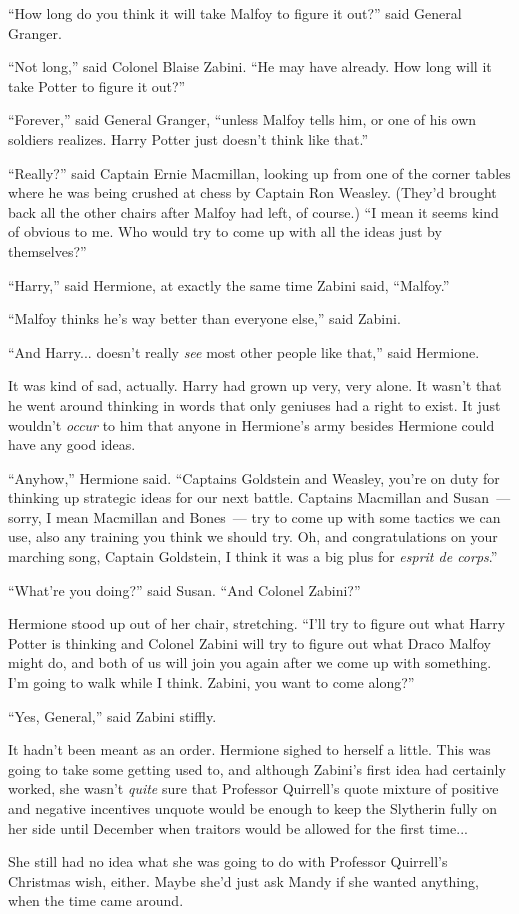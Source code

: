``How long do you think it will take Malfoy to figure it out?'' said General Granger.

``Not long,'' said Colonel Blaise Zabini. ``He may have already. How long will it take Potter to figure it out?''

``Forever,'' said General Granger, ``unless Malfoy tells him, or one of his own soldiers realizes. Harry Potter just doesn't think like that.''

``Really?'' said Captain Ernie Macmillan, looking up from one of the corner tables where he was being crushed at chess by Captain Ron Weasley. (They'd brought back all the other chairs after Malfoy had left, of course.) ``I mean it seems kind of obvious to me. Who would try to come up with all the ideas just by themselves?''

``Harry,'' said Hermione, at exactly the same time Zabini said, ``Malfoy.''

``Malfoy thinks he's way better than everyone else,'' said Zabini.

``And Harry... doesn't really \emph{see} most other people like that,'' said Hermione.

It was kind of sad, actually. Harry had grown up very, very alone. It wasn't that he went around thinking in words that only geniuses had a right to exist. It just wouldn't \emph{occur} to him that anyone in Hermione's army besides Hermione could have any good ideas.

``Anyhow,'' Hermione said. ``Captains Goldstein and Weasley, you're on duty for thinking up strategic ideas for our next battle. Captains Macmillan and Susan~--- sorry, I mean Macmillan and Bones~--- try to come up with some tactics we can use, also any training you think we should try. Oh, and congratulations on your marching song, Captain Goldstein, I think it was a big plus for \emph{esprit de corps}.''

``What're you doing?'' said Susan. ``And Colonel Zabini?''

Hermione stood up out of her chair, stretching. ``I'll try to figure out what Harry Potter is thinking and Colonel Zabini will try to figure out what Draco Malfoy might do, and both of us will join you again after we come up with something. I'm going to walk while I think. Zabini, you want to come along?''

``Yes, General,'' said Zabini stiffly.

It hadn't been meant as an order. Hermione sighed to herself a little. This was going to take some getting used to, and although Zabini's first idea had certainly worked, she wasn't \emph{quite} sure that Professor Quirrell's quote mixture of positive and negative incentives unquote would be enough to keep the Slytherin fully on her side until December when traitors would be allowed for the first time...

She still had no idea what she was going to do with Professor Quirrell's Christmas wish, either. Maybe she'd just ask Mandy if she wanted anything, when the time came around.
